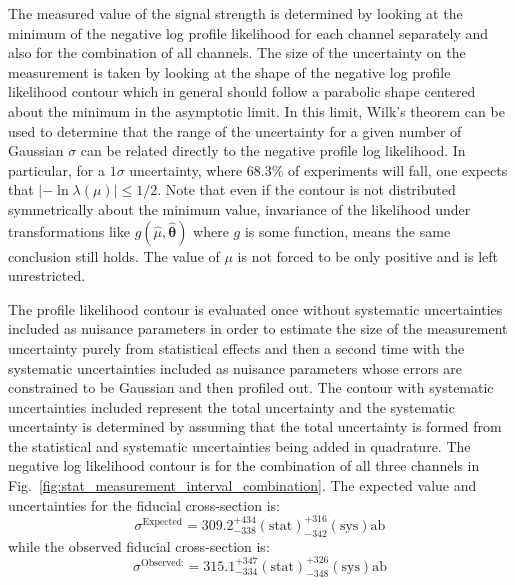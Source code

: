 The measured value of the signal strength is determined by looking 
at the minimum 
of the negative log profile likelihood for each channel separately and also 
for the combination of all channels. The size of the uncertainty on the 
measurement is taken by looking at the shape of the negative log 
profile likelihood contour which in general should follow a parabolic
shape centered about the minimum in the asymptotic limit. In this limit,
Wilk's theorem \cite{Wilk:1938}
can be used \cite{PDG:2014}
to determine that
the range of the 
uncertainty for a given number of Gaussian $\sigma$ can be related
directly 
to the negative profile log likelihood.  In particular, for 
a $1\sigma$ uncertainty, where $68.3\%$ of experiments will fall, 
one expects that 
$|-\ln \lambda(\mu)| \leq 1/2$.
Note that even if the contour is not distributed symmetrically about 
the minimum
value, invariance of the likelihood under 
transformations like $g(\hat{\mu},\hat{\boldsymbol{\theta}})$ where $g$ is some function, 
means the same conclusion still holds.
The value of $\mu$ is not forced to be only positive and is 
left unrestricted. 

The profile likelihood contour is evaluated once without 
systematic uncertainties included
as nuisance parameters in order to estimate the size of the 
measurement uncertainty purely 
from statistical effects and then a second time with the 
systematic uncertainties included
as nuisance parameters whose errors are constrained to be Gaussian and then 
profiled out. The contour with systematic uncertainties included represent
the total uncertainty and the systematic uncertainty is determined by 
assuming that
the total uncertainty is formed from the statistical and systematic 
uncertainties being added
in quadrature.
The negative log likelihood contour is 
for the combination of all three channels in 
Fig.~\ref{fig:stat_measurement_interval_combination}.
The expected value and uncertainties for the fiducial cross-section is:
\begin{equation}
\sigma^{\textrm{Expected}} = 309.2  ^{+434}_{-338} (\textrm{stat}) ^{+316}_{-342} (\textrm{sys}) \textrm{ab}
\end{equation}
while the observed fiducial cross-section is:
\begin{equation}
\sigma^{\textrm{Observed:}} = 315.1  ^{+347}_{-334} (\textrm{stat}) ^{+326}_{-348} (\textrm{sys}) \textrm{ab}
\end{equation}

